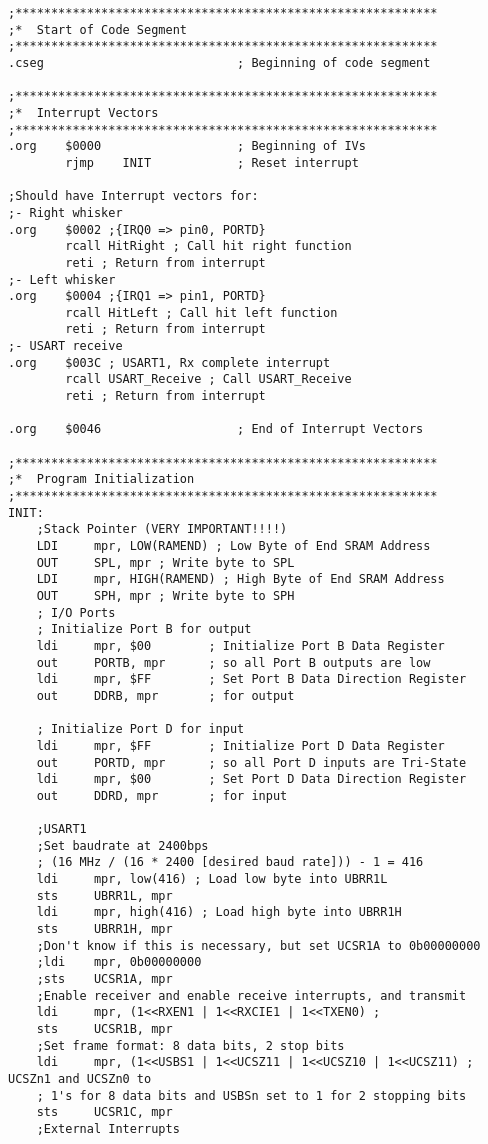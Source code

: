 \documentclass[12pt,letterpaper]{article}
\begin{document}
{\begin{verbatim}
;***********************************************************
;*	Start of Code Segment
;***********************************************************
.cseg							; Beginning of code segment

;***********************************************************
;*	Interrupt Vectors
;***********************************************************
.org	$0000					; Beginning of IVs
		rjmp 	INIT			; Reset interrupt

;Should have Interrupt vectors for:
;- Right whisker
.org 	$0002 ;{IRQ0 => pin0, PORTD}
		rcall HitRight ; Call hit right function
		reti ; Return from interrupt
;- Left whisker
.org 	$0004 ;{IRQ1 => pin1, PORTD}
		rcall HitLeft ; Call hit left function
		reti ; Return from interrupt
;- USART receive
.org 	$003C ; USART1, Rx complete interrupt
		rcall USART_Receive ; Call USART_Receive
		reti ; Return from interrupt

.org	$0046					; End of Interrupt Vectors

;***********************************************************
;*	Program Initialization
;***********************************************************
INIT:
	;Stack Pointer (VERY IMPORTANT!!!!)
	LDI 	mpr, LOW(RAMEND) ; Low Byte of End SRAM Address
	OUT 	SPL, mpr ; Write byte to SPL
	LDI 	mpr, HIGH(RAMEND) ; High Byte of End SRAM Address
	OUT 	SPH, mpr ; Write byte to SPH
	; I/O Ports
	; Initialize Port B for output
	ldi		mpr, $00		; Initialize Port B Data Register
	out		PORTB, mpr		; so all Port B outputs are low	
	ldi		mpr, $FF		; Set Port B Data Direction Register
	out		DDRB, mpr		; for output
	
	; Initialize Port D for input
	ldi		mpr, $FF		; Initialize Port D Data Register
	out		PORTD, mpr		; so all Port D inputs are Tri-State
	ldi		mpr, $00		; Set Port D Data Direction Register
	out		DDRD, mpr		; for input

	;USART1
	;Set baudrate at 2400bps
	; (16 MHz / (16 * 2400 [desired baud rate])) - 1 = 416
	ldi 	mpr, low(416) ; Load low byte into UBRR1L
	sts 	UBRR1L, mpr
	ldi 	mpr, high(416) ; Load high byte into UBRR1H
	sts 	UBRR1H, mpr
	;Don't know if this is necessary, but set UCSR1A to 0b00000000
	;ldi 	mpr, 0b00000000
	;sts 	UCSR1A, mpr
	;Enable receiver and enable receive interrupts, and transmit
	ldi 	mpr, (1<<RXEN1 | 1<<RXCIE1 | 1<<TXEN0) ; 
	sts		UCSR1B, mpr
	;Set frame format: 8 data bits, 2 stop bits
	ldi		mpr, (1<<USBS1 | 1<<UCSZ11 | 1<<UCSZ10 | 1<<UCSZ11) ; UCSZn1 and UCSZn0 to 
	; 1's for 8 data bits and USBSn set to 1 for 2 stopping bits
	sts 	UCSR1C, mpr
	;External Interrupts


\end{verbatim}}
\end{document}
